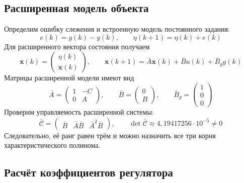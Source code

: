\subsection{Расширенная модель объекта}

Определим ошибку слежения и встроенную модель постоянного задания:
\begin{equation}
  e(k)=g(k)-y(k),
  \qquad \eta(k+1)=\eta(k)+e(k)
  \label{eq:internal-model}
\end{equation}
Для расширенного вектора состояния получаем
\begin{equation}
  \bar{\bm x}(k)=\begin{pmatrix}\eta(k)\\\bm x(k)\end{pmatrix},
  \qquad
  \bar{\bm x}(k+1)
    =\bar A\bar{\bm x}(k)+\bar B u(k)+\bar B_g g(k)
  \label{eq:augmented-plant}
\end{equation}
Матрицы расширенной модели имеют вид
\begin{equation}
  \bar A=\begin{pmatrix}1&-C\\0&A\end{pmatrix},
  \qquad
  \bar B=\begin{pmatrix}0\\B\end{pmatrix},
  \qquad
  \bar B_g=\begin{pmatrix}1\\0\\0\end{pmatrix}
  \label{eq:augmented-matrices}
\end{equation}
Проверим управляемость расширенной системы:
\begin{equation}
  \bar{\mathcal C}
    =\begin{pmatrix}\bar B&\bar A\bar B&\bar A^2\bar B\end{pmatrix},
  \qquad
  \det\bar{\mathcal C}\approx4{,}19417256\cdot10^{-5}\ne0
  \label{eq:augmented-controllability}
\end{equation}
Следовательно, её ранг равен трём и можно назначить все три корня
характеристического полинома.

\subsection{Расчёт коэффициентов регулятора}

